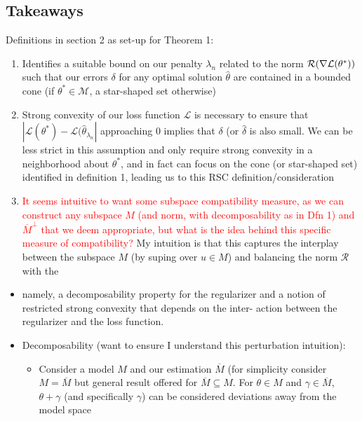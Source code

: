 \documentclass[11pt]{article}
\begin{document}
\subsection*{Takeaways}


Definitions in section 2 as set-up for Theorem 1:
\begin{enumerate}
	\item Identifies a suitable bound on our penalty $\lambda_n$ related to the norm $\mathcal{R}(\nabla \mathcal{L}(\theta^*))$ such that our errors $\delta$ for any optimal solution $\hat{\theta}$ are contained in a bounded cone (if $\theta^* \in \mathcal{M}$, a star-shaped set otherwise)
	\item Strong convexity of our loss function $\mathcal{L}$ is necessary to ensure that $|\mathcal{L}(\theta^*) - \mathcal{L}(\hat{\theta}_{\lambda_n}|$ approaching 0 implies that $\delta$ (or $\hat{\delta}$ is also small. We can be less strict in this assumption and only require strong convexity in a neighborhood about $\theta^*$, and in fact can focus on the cone (or star-shaped set) identified in definition 1, leading us to this RSC definition/consideration 
	\item \textcolor{red}{It seems intuitive to want some subspace compatibility measure, as we can construct any subspace $M$ (and norm, with decomposability as in Dfn 1) and $\overline{M}^\perp$ that we deem appropriate, but what is the idea behind this specific measure of compatibility? } My intuition is that this captures the interplay between the subspace $M$ (by suping over $u \in M$) and balancing the norm $\mathcal{R}$ with the 
\end{enumerate}

\begin{itemize}
	\item namely, a decomposability property for the regularizer and a notion of restricted strong convexity that depends on the inter- action between the regularizer and the loss function.
	\item Decomposability (want to ensure I understand this perturbation intuition): 
		\begin{itemize}
            \item Consider a model $M$ and our estimation $\overline{M}$ (for simplicity consider $M = \overline{M}$ but general result offered for $\overline{M} \subseteq M$. For $\theta \in M$ and $\gamma \in \overline{M}$, $\theta+\gamma$ (and specifically $\gamma$) can be considered deviations away from the model space 
        \end{itemize}
\end{itemize}
\end{document}
